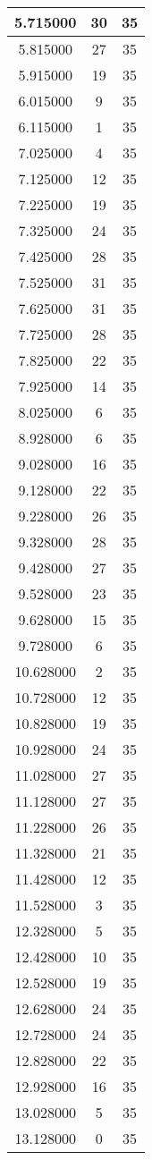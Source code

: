 \begin{longtable}[htbp]{|c|c|c|}
5.715000 & 30 & 35 \\ \hline
5.815000 & 27 & 35 \\ \hline
5.915000 & 19 & 35 \\ \hline
6.015000 & 9 & 35 \\ \hline
6.115000 & 1 & 35 \\ \hline
7.025000 & 4 & 35 \\ \hline
7.125000 & 12 & 35 \\ \hline
7.225000 & 19 & 35 \\ \hline
7.325000 & 24 & 35 \\ \hline
7.425000 & 28 & 35 \\ \hline
7.525000 & 31 & 35 \\ \hline
7.625000 & 31 & 35 \\ \hline
7.725000 & 28 & 35 \\ \hline
7.825000 & 22 & 35 \\ \hline
7.925000 & 14 & 35 \\ \hline
8.025000 & 6 & 35 \\ \hline
8.928000 & 6 & 35 \\ \hline
9.028000 & 16 & 35 \\ \hline
9.128000 & 22 & 35 \\ \hline
9.228000 & 26 & 35 \\ \hline
9.328000 & 28 & 35 \\ \hline
9.428000 & 27 & 35 \\ \hline
9.528000 & 23 & 35 \\ \hline
9.628000 & 15 & 35 \\ \hline
9.728000 & 6 & 35 \\ \hline
10.628000 & 2 & 35 \\ \hline
10.728000 & 12 & 35 \\ \hline
10.828000 & 19 & 35 \\ \hline
10.928000 & 24 & 35 \\ \hline
11.028000 & 27 & 35 \\ \hline
11.128000 & 27 & 35 \\ \hline
11.228000 & 26 & 35 \\ \hline
11.328000 & 21 & 35 \\ \hline
11.428000 & 12 & 35 \\ \hline
11.528000 & 3 & 35 \\ \hline
12.328000 & 5 & 35 \\ \hline
12.428000 & 10 & 35 \\ \hline
12.528000 & 19 & 35 \\ \hline
12.628000 & 24 & 35 \\ \hline
12.728000 & 24 & 35 \\ \hline
12.828000 & 22 & 35 \\ \hline
12.928000 & 16 & 35 \\ \hline
13.028000 & 5 & 35 \\ \hline
13.128000 & 0 & 35 \\ \hline
\end{longtable}
